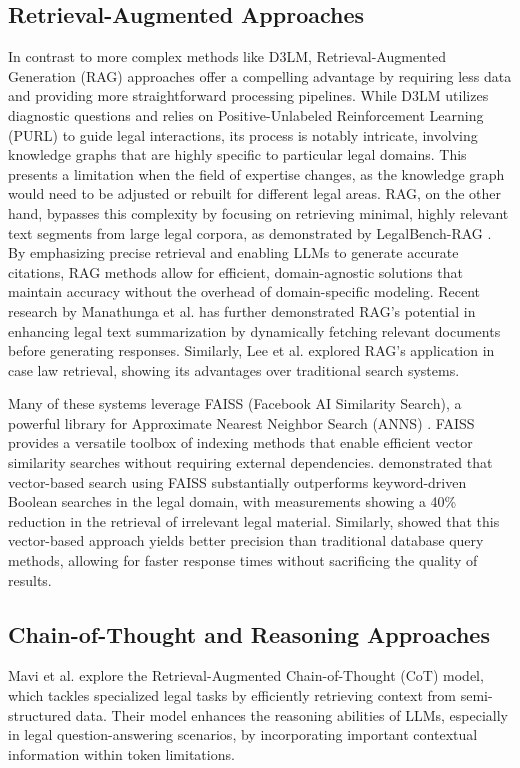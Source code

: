 \subsection{Retrieval-Augmented Approaches}
In contrast to more complex methods like D3LM, Retrieval-Augmented Generation
(RAG) approaches offer a compelling advantage by requiring less data and
providing more straightforward processing pipelines. While D3LM utilizes
diagnostic questions and relies on Positive-Unlabeled Reinforcement Learning
(PURL) to guide legal interactions, its process is notably intricate,
involving knowledge graphs that are highly specific to particular
legal domains. This presents a limitation when the field of expertise changes,
as the knowledge graph would need to be adjusted or rebuilt for different legal
areas.
RAG, on the other hand, bypasses this complexity by focusing on retrieving
minimal, highly relevant text segments from large legal corpora, as
demonstrated by LegalBench-RAG \cite{pipitone2024legalbenchragbenchmarkretrievalaugmentedgeneration}.
By emphasizing precise retrieval and enabling LLMs to generate accurate
citations, RAG methods allow for efficient, domain-agnostic solutions that
maintain accuracy without the overhead of domain-specific modeling. Recent
research by Manathunga et al. \cite{manathunga2023retrievalaugmentedgenerationrepresentative} has
further demonstrated RAG's potential in enhancing legal text summarization by dynamically
fetching relevant documents before generating responses. Similarly,
Lee et al. \cite{ryu-etal-2023-retrieval} explored RAG's application in case
law retrieval, showing its advantages over traditional search systems.

Many of these systems leverage FAISS (Facebook AI Similarity Search), a powerful library for 
Approximate Nearest Neighbor Search (ANNS) \cite{douze2025faisslibrary}. FAISS provides a versatile 
toolbox of indexing methods that enable efficient vector similarity searches without requiring external 
dependencies. \cite{zeng2023scalableeffectivegenerativeinformation} demonstrated that vector-based search using 
FAISS substantially outperforms keyword-driven Boolean searches in the legal domain, with measurements showing a 40\% 
reduction in the retrieval of irrelevant legal material. Similarly, \cite{panchal2025lawpalretrievalaugmented} showed 
that this vector-based approach yields better precision than traditional database query methods, allowing for faster 
response times without sacrificing the quality of results.

\subsection{Chain-of-Thought and Reasoning Approaches}
Mavi et al. \cite{mavi2023retrievalaugmentedchainofthoughtsemistructureddomains} 
explore the Retrieval-Augmented Chain-of-Thought (CoT) model, which tackles specialized 
legal tasks by efficiently retrieving context from semi-structured data. Their model 
enhances the reasoning abilities of LLMs, especially in legal question-answering 
scenarios, by incorporating important contextual information within token limitations.

